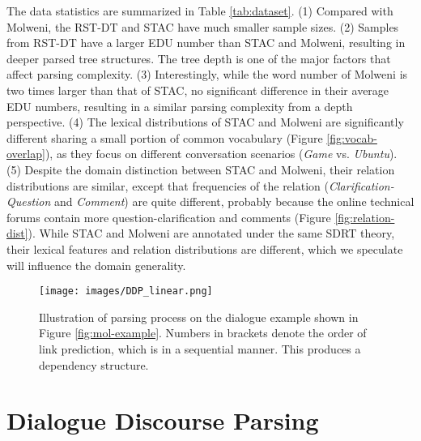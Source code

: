 \documentclass[11pt]{article}
\begin{document}
The data statistics are summarized in Table \ref{tab:dataset}. (1) Compared with Molweni, the RST-DT and STAC have much smaller sample sizes. (2) Samples from RST-DT have a larger EDU number than STAC and Molweni, resulting in deeper parsed tree structures. The tree depth is one of the major factors that affect parsing complexity. (3) Interestingly, while the word number of Molweni is two times larger than that of STAC, no significant difference in their average EDU numbers, resulting in a similar parsing complexity from a depth perspective. (4) The lexical distributions of STAC and Molweni are significantly different sharing a small portion of common vocabulary (Figure \ref{fig:vocab-overlap}), as they focus on different conversation scenarios (\textit{Game} vs. \textit{Ubuntu}). (5) Despite the domain distinction between STAC and Molweni, their relation distributions are similar, except that frequencies of the relation (\textit{Clarification-Question} and \textit{Comment}) are quite different, probably because the online technical forums contain more question-clarification and comments (Figure \ref{fig:relation-dist}). While STAC and Molweni are annotated under the same SDRT theory, their lexical features and relation distributions are different, which we speculate will influence the domain generality.


\begin{figure}[t!]
    \begin{center}
    \texttt{[image: images/DDP\_linear.png]}
    \end{center}
     \caption{Illustration of parsing process on the dialogue example shown in Figure \ref{fig:mol-example}. Numbers in brackets denote the order of link prediction, which is in a sequential manner. This produces a dependency structure.}
    \label{fig:link-process}
\vspace{-0.2cm}
\end{figure}

\section{Dialogue Discourse Parsing}
\end{document}
